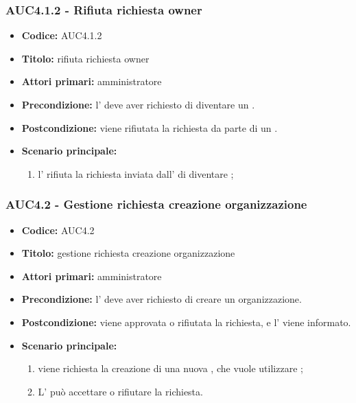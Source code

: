 \documentclass[casi-duso]{subfiles}
\begin{document}
\subsubsection{AUC4.1.2 - Rifiuta richiesta owner}%
\label{subsub:AUC4.1.2}
\begin{itemize}
  \item \textbf{Codice:} AUC4.1.2
  \item \textbf{Titolo:} rifiuta richiesta owner
  \item \textbf{Attori primari:} amministratore
  \item \textbf{Precondizione:} l' deve aver richiesto di diventare un .
  \item \textbf{Postcondizione:} viene rifiutata la richiesta da parte di un .
  \item \textbf{Scenario principale:}
  \begin{enumerate}
    \item l' rifiuta la richiesta inviata dall' di diventare ;
  \end{enumerate}
\end{itemize}

\subsubsection{AUC4.2 - Gestione richiesta creazione organizzazione}%
\label{subsub:AUC4.2}
\begin{itemize}
  \item \textbf{Codice:} AUC4.2
  \item \textbf{Titolo:} gestione richiesta creazione organizzazione
  \item \textbf{Attori primari:} amministratore
  \item \textbf{Precondizione:} l' deve aver richiesto di creare un organizzazione.
  \item \textbf{Postcondizione:} viene approvata o rifiutata la richiesta, e l' viene informato.
  \item \textbf{Scenario principale:}
  \begin{enumerate}
    \item viene richiesta la creazione di una nuova , che vuole utilizzare ;
    \item L' può accettare o rifiutare la richiesta.
  \end{enumerate}
\end{itemize}
\end{document}
